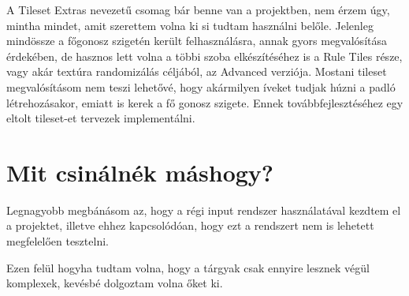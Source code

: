\documentclass[
]{thesis-ekf}
\theoremstyle{definition}
\theoremstyle{remark}
\begin{document}
	A Tileset Extras nevezetű csomag bár benne van a projektben, nem érzem úgy, mintha mindet, amit szerettem volna ki si tudtam használni belőle. Jelenleg mindössze a főgonosz szigetén került felhasználásra, annak gyors megvalósítása érdekében, de hasznos lett volna a többi szoba elkészítéséhez is a Rule Tiles \cite{ruleTiles} része, vagy akár textúra randomizálás céljából, az Advanced \cite{advancedRuleTileset} verziója. Mostani tileset megvalósításom nem teszi lehetővé, hogy akármilyen íveket tudjak húzni a padló létrehozásakor, emiatt is kerek a fő gonosz szigete. Ennek továbbfejlesztéséhez egy eltolt tileset-et tervezek implementálni.
	
	\section{Mit csinálnék máshogy?}
	Legnagyobb megbánásom az, hogy a régi input rendszer használatával kezdtem el a projektet, illetve ehhez kapcsolódóan, hogy ezt a rendszert nem is lehetett megfelelően tesztelni.
	
	Ezen felül hogyha tudtam volna, hogy a tárgyak csak ennyire lesznek végül komplexek, kevésbé dolgoztam volna őket ki.
	
	\listoffigures
	
\end{document}
